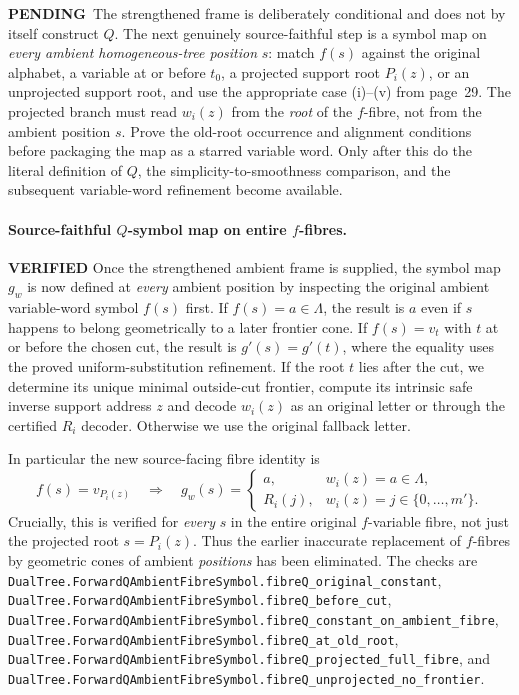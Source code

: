 \documentclass[11pt]{article}
\newcommand{\ok}{\textcolor{green!40!black}{\textbf{VERIFIED}}}
\newcommand{\todo}{\textcolor{gray!70!black}{\textbf{PENDING}}}
\newcommand{\lean}[1]{\texttt{#1}}
\begin{document}
\todo\ The strengthened frame is deliberately conditional and
does not by itself construct $Q$. The next genuinely
source-faithful step is a symbol map on \emph{every ambient
homogeneous-tree position} $s$: match $f(s)$ against the
original alphabet, a variable at or before $t_0$,
a projected support root $P_i(z)$, or an unprojected
support root, and use the appropriate case (i)--(v)
from page~29. The projected branch must read
$w_i(z)$ from the \emph{root} of the $f$-fibre,
not from the ambient position $s$. Prove the
old-root occurrence and alignment conditions
before packaging the map as a starred variable word.
Only after this do the literal definition of
$Q$, the simplicity-to-smoothness comparison,
and the subsequent variable-word refinement become available.


\paragraph{Source-faithful $Q$-symbol map on entire $f$-fibres.} \ok
Once the strengthened ambient frame is supplied, the symbol map
$g_w$ is now defined at \emph{every} ambient position by inspecting
the original ambient variable-word symbol $f(s)$ first.
If $f(s)=a\in\Lambda$, the result is $a$ even if $s$
happens to belong geometrically to a later frontier cone.
If $f(s)=v_t$ with $t$ at or before the chosen cut,
the result is $g'(s)=g'(t)$, where the equality uses the
proved uniform-substitution refinement. If the root $t$
lies after the cut, we determine its unique minimal
outside-cut frontier, compute its intrinsic safe inverse
support address $z$ and decode $w_i(z)$ as an original
letter or through the certified $R_i$ decoder. Otherwise
we use the original fallback letter.

In particular the new source-facing fibre identity is
\[
  f(s)=v_{P_i(z)}
  \quad\Longrightarrow\quad
  g_w(s)=
  \begin{cases}
    a,& w_i(z)=a\in\Lambda,\\
    R_i(j),& w_i(z)=j\in\{0,\ldots,m'\}.
  \end{cases}
\]
Crucially, this is verified for \emph{every} $s$ in the
entire original $f$-variable fibre, not just the projected
root $s=P_i(z)$. Thus the earlier inaccurate replacement
of $f$-fibres by geometric cones of ambient \emph{positions}
has been eliminated. The checks are
\lean{DualTree.ForwardQAmbientFibreSymbol.fibreQ_original_constant},
\lean{DualTree.ForwardQAmbientFibreSymbol.fibreQ_before_cut},
\lean{DualTree.ForwardQAmbientFibreSymbol.fibreQ_constant_on_ambient_fibre},
\lean{DualTree.ForwardQAmbientFibreSymbol.fibreQ_at_old_root},
\lean{DualTree.ForwardQAmbientFibreSymbol.fibreQ_projected_full_fibre},
and
\lean{DualTree.ForwardQAmbientFibreSymbol.fibreQ_unprojected_no_frontier}.
\end{document}
